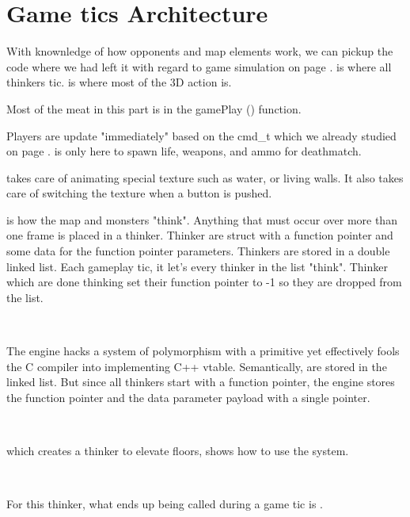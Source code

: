 \section{Game tics Architecture}
With knownledge of how opponents and map elements work, we can pickup the code where we had left it with regard to game simulation on page \pageref{TryRunTics.c}.  is where all thinkers tic.  is where most of the 3D action is.\\
\par
{}
\par
Most of the meat in this part is in the gamePlay () function.\\
\par
{}
\par
Players are update "immediately" based on the cmd\_t which we already studied on page \pageref{cmd_t_type}.  is only here to spawn life, weapons, and ammo for deathmatch.\\
\par {} takes care of animating special texture such as water, or living walls. It also takes care of switching the texture when a button is pushed.\\
\par {} is how the map and monsters "think". Anything that must occur over more than one frame is placed in a thinker. Thinker are struct with a function pointer and some data for the function pointer parameters. Thinkers are stored in a double linked list. Each gameplay tic, it let's every thinker in the list "think". Thinker which are done thinking set their function pointer to -1 so they are dropped from the list.

\\
\par
The engine hacks a system of polymorphism with a primitive yet effectively fools the C compiler into implementing C++ vtable. Semantically,  are stored in the linked list. But since all thinkers start with a function pointer, the engine stores the function pointer and the data parameter payload with a single pointer. \\
\par
{}\\
\par
{} which creates a thinker to elevate floors, shows how to use the system.\\
\par
{}\\
\par
For this thinker, what ends up being called during a game tic is .